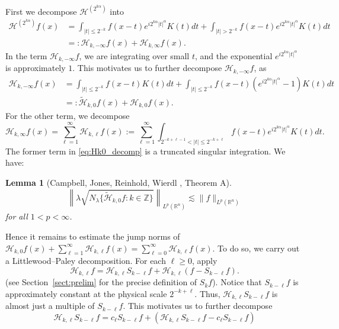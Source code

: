 \documentclass[12pt,leqno]{amsart}
\def\R{\mathbb{R}}
\def\Z{\mathbb{Z}}
\theoremstyle{plain}
\newtheorem{lem}[thm]{Lemma}
\numberwithin{equation}{section}
\begin{document}
First we decompose $\mathcal{H}^{(2^{k\alpha})}$ into 
\[
\begin{split}
\mathcal{H}^{(2^{k\alpha})} f(x)&= \int_{|t| \leq 2^{-k}} f(x-t) e^{i 2^{k\alpha} |t|^{\alpha}} K(t)dt+ \int_{|t| > 2^{-k}}  f(x-t) e^{i 2^{k\alpha} |t|^{\alpha}} K(t)dt\\
& =: \mathcal{H}_{k, -\infty} f(x)+ \mathcal{H}_{k, \infty} f(x).
\end{split}
\]
In the term $\mathcal{H}_{k, -\infty}f$, we are integrating over small $t$, and the exponential $e^{i 2^{k\alpha} |t|^{\alpha}}$ is approximately $1$. This motivates us to further decompose $\mathcal{H}_{k,-\infty} f$, as
\begin{equation} \label{eq:Hk0_decomp}
\begin{split}
\mathcal{H}_{k,-\infty}f(x) &=\int_{|t| \leq 2^{-k}} f(x-t) K(t)dt+\int_{|t| \leq 2^{-k}} f(x-t) (e^{i 2^{k\alpha} |t|^{\alpha}}-1) K(t)dt\\
& =:\widetilde{\mathcal{H}}_{k,0} f(x) + \mathcal{H}_{k,0} f(x).
\end{split}
\end{equation}
For the other term, we decompose 
\[ 
\mathcal{H}_{k,\infty} f(x)=
\sum_{\ell = 1}^{\infty} \mathcal{H}_{k,\ell} f(x) :=\sum_{\ell = 1}^{\infty} \int_{2^{-k+\ell-1} < |t| \leq 2^{-k+\ell}} f(x-t) e^{i 2^{k\alpha} |t|^{\alpha}} K(t)dt.
\]
The former term in \eqref{eq:Hk0_decomp} is a truncated singular integration. We have: 
\begin{lem}[Campbell, Jones, Reinhold, Wierdl \cite{MR1953540}, Theorem A]
\[ \left\| \lambda \sqrt{ N_{\lambda} \{\widetilde{\mathcal{H}}_{k,0} f \colon k \in \Z\} } \right\|_{L^p(\R^n)} \lesssim \|f\|_{L^p(\R^n)}
\] for all $1 < p < \infty$.
\end{lem}
Hence it remains to estimate the jump norms of $\mathcal{H}_{k,0} f(x) + \sum_{\ell=1}^{\infty} \mathcal{H}_{k,\ell}f(x) = \sum_{\ell = 0}^{\infty} \mathcal{H}_{k,\ell} f(x)$. To do so, we carry out a Littlewood--Paley decomposition. For each $\ell \ge 0$, apply
\[ 
\mathcal{H}_{k,\ell} f = \mathcal{H}_{k,\ell} S_{k-\ell} f + \mathcal{H}_{k,\ell} (f - S_{k-\ell} f).
\]
(see Section~\ref{sect:prelim} for the precise definition of $S_k f$). Notice that $S_{k-\ell} f$ is approximately constant at the physical scale $2^{-k+\ell}$. Thus, $\mathcal{H}_{k,\ell} S_{k-\ell} f$ is almost just a multiple of $S_{k-\ell} f$. This motivates us to further decompose
\[
\mathcal{H}_{k,\ell} S_{k-\ell} f = c_{\ell} S_{k-\ell} f + \left(\mathcal{H}_{k,\ell} S_{k-\ell} f -  c_{\ell} S_{k-\ell} f \right)
\]
\end{document}
